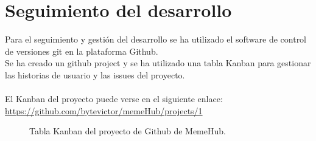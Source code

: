 \newpage
\section{Seguimiento del desarrollo}
Para el seguimiento y gestión del desarrollo se ha utilizado el software de control de versiones
git\cite{git} en la plataforma Github\cite{Github}.
\\
Se ha creado un github project y se ha utilizado una tabla Kanban para gestionar las historias 
de usuario y las issues del proyecto.
\\\\
El Kanban del proyecto puede verse en el siguiente enlace:
\url{https://github.com/bytevictor/memeHub/projects/1}

\begin{figure}[!h]
  \centering
  \noindent{}
  \caption{Tabla Kanban del proyecto de Github de MemeHub.}
\end{figure}